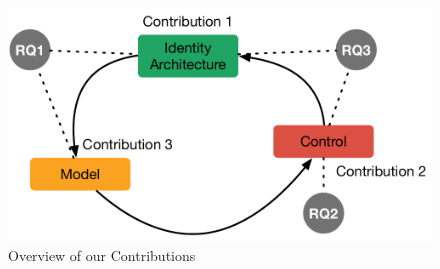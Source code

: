 \begin{figure}[H]
\includegraphics[scale=.5]{images/controlloop}
\caption{Overview of our Contributions}
\label{contrib}
\end{figure}


%
%
%

